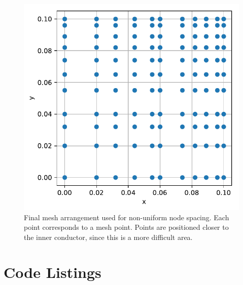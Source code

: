 \documentclass[a4paper,titlepage]{article}
\begin{document}
	\begin{figure}[!htb]
		\centering
		\includegraphics[width=\columnwidth]{plots/q3e.pdf}
		\caption
		{Final mesh arrangement used for non-uniform node spacing. Each point corresponds to a mesh point. Points are positioned closer to the inner conductor, since this is a more difficult area.}
		\label{fig:q3e}
	\end{figure}
	
	\onecolumn
	
	\appendix
	
	\section{Code Listings} \label{appendix:listings}
	
	\begin{center}
		\inputminted{python}{../matrices.py}
		\label{lst:matrices}
	\end{center}

	\begin{center}
		\inputminted{python}{../choleski.py}
		\label{lst:choleski}
	\end{center}

	\begin{center}
		\inputminted{python}{../linear_networks.py}
		\label{lst:linear_networks}
	\end{center}
\end{document}
